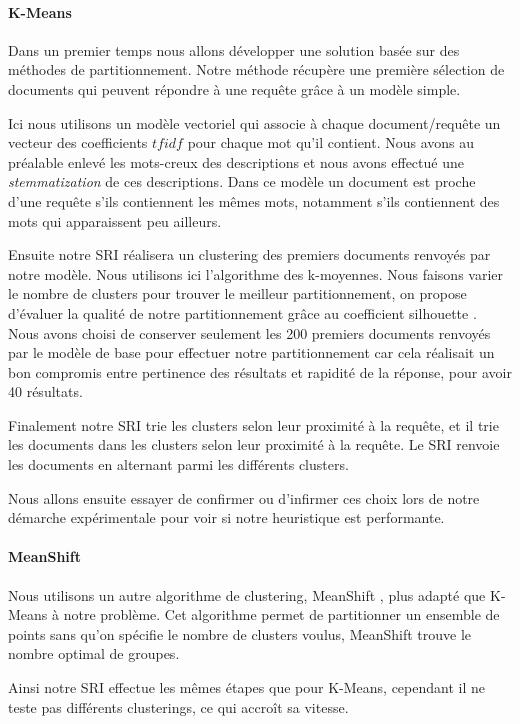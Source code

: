 \documentclass{article}
\begin{document}
\paragraph{K-Means}

Dans un premier temps nous allons développer une solution basée sur des méthodes de partitionnement. Notre méthode récupère une première sélection de documents qui peuvent répondre à une requête grâce à un modèle simple. 

Ici nous utilisons un modèle vectoriel qui associe à chaque document/requête un vecteur des coefficients $tfidf$ pour chaque mot qu'il contient. Nous avons au préalable enlevé les mots-creux des descriptions et nous avons effectué une \textit{stemmatization} de ces descriptions. Dans ce modèle un document est proche d'une requête s'ils contiennent les mêmes mots, notamment s'ils contiennent des mots qui apparaissent peu ailleurs.

Ensuite notre SRI réalisera un clustering des premiers documents renvoyés par notre modèle. Nous utilisons ici l'algorithme des k-moyennes. Nous faisons varier le nombre de clusters pour trouver le meilleur partitionnement, on propose d'évaluer la qualité de notre partitionnement grâce au coefficient silhouette \cite{rousseeuw87}. 
Nous avons choisi de conserver seulement les 200 premiers documents renvoyés par le modèle de base pour effectuer notre partitionnement car cela réalisait un bon compromis entre pertinence des résultats et rapidité de la réponse, pour avoir 40 résultats.

Finalement notre SRI trie les clusters selon leur proximité à la requête, et il trie les documents dans les clusters selon leur proximité à la requête. Le SRI renvoie les documents en alternant parmi les différents clusters. 

Nous allons ensuite essayer de confirmer ou d'infirmer ces choix lors de notre démarche expérimentale pour voir si notre heuristique est performante. 

\paragraph{MeanShift}
Nous utilisons un autre algorithme de clustering, MeanShift \cite{fukunuga75}, plus adapté que K-Means à notre problème.
Cet algorithme permet de partitionner un ensemble de points sans qu'on spécifie le nombre de clusters voulus, MeanShift trouve le nombre optimal de groupes.

Ainsi notre SRI effectue les mêmes étapes que pour K-Means, cependant il ne teste pas différents clusterings, ce qui accroît sa vitesse.
\end{document}
